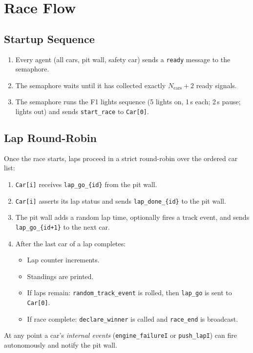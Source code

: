 \section{Race Flow}

\subsection{Startup Sequence}

\begin{enumerate}[leftmargin=2em]
  \item Every agent (all cars, pit wall, safety car) sends a \texttt{ready} message to the
        semaphore.
  \item The semaphore waits until it has collected exactly $N_\text{cars} + 2$ ready signals.
  \item The semaphore runs the F1 lights sequence (5 lights on, 1\,s each; 2\,s pause;
        lights out) and sends \texttt{start\_race} to \texttt{Car[0]}.
\end{enumerate}

\subsection{Lap Round-Robin}

Once the race starts, laps proceed in a strict round-robin over the ordered car list:

\begin{enumerate}[leftmargin=2em]
  \item \texttt{Car[i]} receives \texttt{lap\_go\_\{id\}} from the pit wall.
  \item \texttt{Car[i]} asserts its lap status and sends \texttt{lap\_done\_\{id\}} to the
        pit wall.
  \item The pit wall adds a random lap time, optionally fires a track event, and sends
        \texttt{lap\_go\_\{id+1\}} to the next car.
  \item After the last car of a lap completes:
        \begin{itemize}
          \item Lap counter increments.
          \item Standings are printed.
          \item If laps remain: \texttt{random\_track\_event} is rolled, then \texttt{lap\_go}
                is sent to \texttt{Car[0]}.
          \item If race complete: \texttt{declare\_winner} is called and \texttt{race\_end}
                is broadcast.
        \end{itemize}
\end{enumerate}

\noindent
At any point a car's \emph{internal events} (\texttt{engine\_failureI} or
\texttt{push\_lapI}) can fire autonomously and notify the pit wall.
